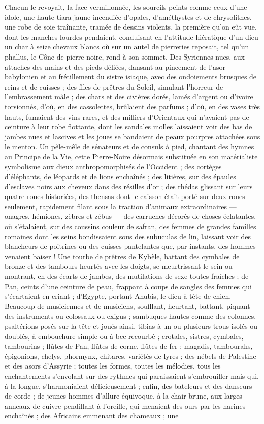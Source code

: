 \documentclass[a4paper, 11pt, oneside, polutonikogreek, french]{article}
\begin{document}
Chacun le revoyait, la face vermillonnée, les sourcils peints comme ceux d'une idole, une haute tiara jaune incendiée d'opales, d'améthystes et de chrysolithes, une robe de soie traînante, tramée de dessins violents, la première qu'on eût vue, dont les manches lourdes pendaient, conduisant en l'attitude hiératique d'un dieu un char à seize chevaux blancs où sur un autel de pierreries reposait, tel qu'un phallus, le Cône de pierre noire, rond à son sommet. Des Syriennes nues, aux attaches des mains et des pieds déliées, dansant au pincement de l'asor babylonien et au frétillement du sistre isiaque, avec des ondoiements brusques de reins et de cuisses ; des files de prêtres du Soleil, simulant l'horreur de l'embrassement mâle ; des chars et des civières dorés, lamés d'argent ou d'ivoire torsionnés, d'où, en des cassolettes, brûlaient des parfums ; d'où, en des vases très hauts, fumaient des vins rares, et des milliers d'Orientaux qui n'avaient pas de ceinture à leur robe flottante, dont les sandales molles laissaient voir des bas de jambes nues et lascives et les joues se bandaient de peaux pourpres attachées sous le menton. Un pêle-mêle de sénateurs et de consuls à pied, chantant des hymnes au Principe de la Vie, cette Pierre-Noire désormais substituée en son matérialiste symbolisme aux dieux anthropomorphisés de l'Occident ; des cortèges d'éléphants, de léopards et de lions enchaînés ; des litières, sur des épaules d'esclaves noirs aux cheveux dans des résilles d'or ; des rhédas glissant sur leurs quatre roues historiées, des thensas dont le caisson était porté sur deux roues seulement, rapidement filant sous la traction d'animaux extraordinaires --- onagres, hémiones, zèbres et zébus --- des carruches décorés de choses éclatantes, où s'étalaient, sur des coussins couleur de safran, des femmes de grandes familles romaines dont les seins bondissaient sous des subuculas de lin, laissant voir des blancheurs de poitrines ou des cuisses pantelantes que, par instants, des hommes venaient baiser ! Une tourbe de prêtres de Kybèle, battant des cymbales de bronze et des tambours heurtés avec les doigts, se meurtrissant le sein ou montrant, en des écarts de jambes, des mutilations de sexe toutes fraîches ; de Pan, ceints d'une ceinture de peau, frappant à coups de sangles des femmes qui s'écartaient en criant ; d'Egypte, portant Anubis, le dieu à tête de chien. Beaucoup de musiciennes et de musiciens, soufflant, heurtant, battant, piquant des instruments ou colossaux ou exigus ; sambuques hautes comme des colonnes, psaltérions posés sur la tête et joués ainsi, tibias à un ou plusieurs trous isolés ou doublés, à embouchure simple ou à bec recourbé ; crotales, sistres, cymbales, tambourins ; flûtes de Pan, flûtes de corne, flûtes de fer ; magadis, tambourahs, épigonions, chelys, phormynx, chitares, variétés de lyres ; des nébels de Palestine et des asors d'Assyrie ; toutes les formes, toutes les mélodies, tous les enchantements s'envolant sur des rythmes qui paraissaient s'embrouiller mais qui, à la longue, s'harmoniaient délicieusement ; enfin, des bateleurs et des danseurs de corde ; de jeunes hommes d'allure équivoque, à la chair brune, aux larges anneaux de cuivre pendillant à l'oreille, qui menaient des ours par les narines enchaînés ; des Africains emmenant des chameaux ; une 
\end{document}
